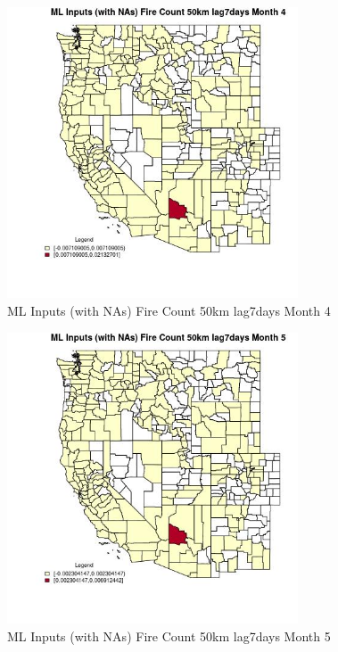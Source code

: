 \begin{figure} 
\centering  
\includegraphics[width=0.77\textwidth]{Code_Outputs/Report_ML_input_PM25_Step4_part_e_de_duplicated_aves_compiled_2019-05-21wNAs_CountyFire_Count_50km_lag7daysmedianMonth4.jpg} 
\caption{\label{fig:Report_ML_input_PM25_Step4_part_e_de_duplicated_aves_compiled_2019-05-21wNAsCountyFire_Count_50km_lag7daysmedianMonth4}ML Inputs (with NAs) Fire Count 50km lag7days Month 4} 
\end{figure} 
 

\begin{figure} 
\centering  
\includegraphics[width=0.77\textwidth]{Code_Outputs/Report_ML_input_PM25_Step4_part_e_de_duplicated_aves_compiled_2019-05-21wNAs_CountyFire_Count_50km_lag7daysmedianMonth5.jpg} 
\caption{\label{fig:Report_ML_input_PM25_Step4_part_e_de_duplicated_aves_compiled_2019-05-21wNAsCountyFire_Count_50km_lag7daysmedianMonth5}ML Inputs (with NAs) Fire Count 50km lag7days Month 5} 
\end{figure} 
 

